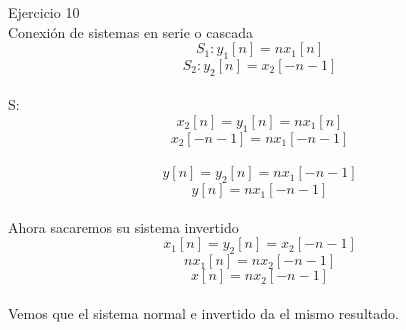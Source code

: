 \documentclass[a4paper,openright,12pt]{report}
\begin{document}
Ejercicio 10\\

Conexión de sistemas en serie o cascada\\

\begin{equation}
S_{1}: y_{1}\left [ n \right ]=nx_{1}\left [ n \right ]
\end{equation}
\begin{equation}
S_{2}: y_{2}\left [ n \right ]=x_{2}\left [ -n-1 \right ]
\end{equation}\\

S:\\

\begin{equation}
x_{2}\left [ n \right ]=y_{1}\left [ n \right ]=nx_{1}\left [ n \right ]
\end{equation}
\begin{equation}
x_{2}\left [ -n-1 \right ]=nx_{1}\left [ -n-1 \right ]
\end{equation}\\

\begin{equation}
y\left [ n \right ]=y_{2}\left [ n \right ]=nx_{1}\left [ -n-1 \right ]
\end{equation}
\begin{equation}
y\left [ n \right ]=nx_{1}\left [ -n-1 \right ]
\end{equation}\\

Ahora sacaremos su sistema invertido\\
\begin{equation}
x_{1}\left [ n \right ]=y_{2}\left [ n \right ]=x_{2}\left [ -n-1 \right ]
\end{equation}
\begin{equation}
nx_{1}\left [ n \right ]=nx_{2}\left [ -n-1 \right ]
\end{equation}
\begin{equation}
x\left [ n \right ]=nx_{2}\left [ -n-1 \right ]
\end{equation}\\

Vemos que el sistema normal e invertido da el mismo resultado.
\end{document}
